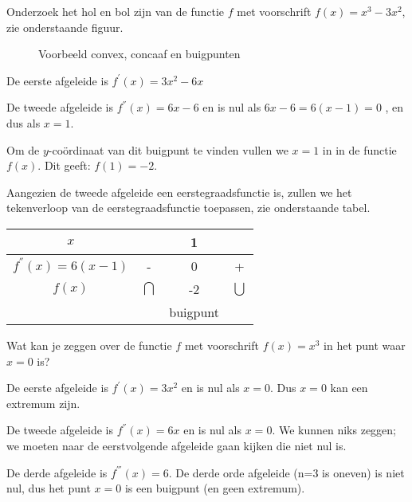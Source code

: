 \begin{voorbeeld}
	Onderzoek het hol en bol zijn van
de functie $f$ met voorschrift $f(x)=x^{3}-3x^{2}$, zie onderstaande figuur.

\begin{figure}[h]
	\centering          
	
	\caption{Voorbeeld convex, concaaf en buigpunten}
	\label{fig:verloop_convex_concaaf_buigpunten}	
\end{figure}


De eerste afgeleide is $f^{'}(x)=3x^{2}-6x$ 

De tweede afgeleide is $f^{''}(x)=6x-6$ en is nul als $6x-6=6(x-1)=0$
, en dus als $x=1$.

Om de $y$-co\"ordinaat van dit buigpunt te vinden vullen
we $x=1$ in in de functie $f(x)$. Dit geeft: $f(1)=-2$.

Aangezien de tweede afgeleide een eerstegraadsfunctie is,
zullen we het tekenverloop van de eerstegraadsfunctie toepassen, zie onderstaande tabel.

\begin{center}
	\begin{tabular}{c||c|c|c}
	$x$ &  & 1 & \tabularnewline
	\hline 
	$f^{''}(x)=6(x-1)$ & - & 0 & +\\
	\hline 
	$f(x)$ & $\bigcap$ & -2 & $\bigcup$\\
	&  & buigpunt & \\
\end{tabular}
\end{center}

\end{voorbeeld}
\begin{voorbeeld}
	Wat kan je zeggen over de functie $f$ met voorschrift
$f(x)=x^{3}$ in het punt waar $x=0$ is?

De eerste afgeleide is $f^{'}(x)=3x^{2}$ en is nul als
$x=0$. Dus $x=0$ kan een extremum zijn.

De tweede afgeleide is $f^{''}(x)=6x$ en is nul als $x=0$.
We kunnen niks zeggen; we moeten naar de eerstvolgende afgeleide gaan
kijken die niet nul is.

De derde afgeleide is $f^{'''}(x)=6$. De derde orde afgeleide
(n=3 is oneven) is niet nul, dus het punt $x=0$ is een buigpunt (en
geen extremum).

\end{voorbeeld}

